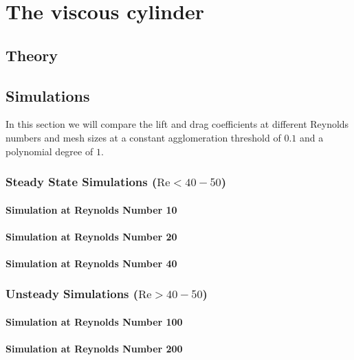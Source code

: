 \chapter{The viscous cylinder}

\section{Theory}

\section{Simulations}
	In this section we will compare the lift and drag coefficients at different Reynolds numbers and mesh sizes at a constant agglomeration threshold of $0.1$ and a polynomial degree of $1$.
	\subsection{Steady State Simulations ($\text{Re} < 40-50$)}
	\subsubsection{Simulation at Reynolds Number 10}
	\subsubsection{Simulation at Reynolds Number 20}
	\subsubsection{Simulation at Reynolds Number 40}
	\subsection{Unsteady Simulations ($\text{Re}> 40-50$)}
	\subsubsection{Simulation at Reynolds Number 100}
	\subsubsection{Simulation at Reynolds Number 200}